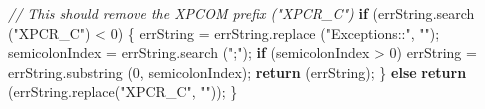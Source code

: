 \documentclass[]{article}
\newenvironment{Shaded}{}{}
\newcommand{\KeywordTok}[1]{\textcolor[rgb]{0.00,0.44,0.13}{\textbf{{#1}}}}
\newcommand{\DecValTok}[1]{\textcolor[rgb]{0.25,0.63,0.44}{{#1}}}
\newcommand{\StringTok}[1]{\textcolor[rgb]{0.25,0.44,0.63}{{#1}}}
\newcommand{\CommentTok}[1]{\textcolor[rgb]{0.38,0.63,0.69}{\textit{{#1}}}}
\newcommand{\OtherTok}[1]{\textcolor[rgb]{0.00,0.44,0.13}{{#1}}}
\newcommand{\FunctionTok}[1]{\textcolor[rgb]{0.02,0.16,0.49}{{#1}}}
\newcommand{\NormalTok}[1]{{#1}}
\begin{document}
\begin{Shaded}
\begin{Highlighting}[]
  \CommentTok{// This should remove the XPCOM prefix ("XPCR_C")}
  \KeywordTok{if} \NormalTok{(}\OtherTok{errString}\NormalTok{.}\FunctionTok{search} \NormalTok{(}\StringTok{"XPCR_C"}\NormalTok{) < }\DecValTok{0}\NormalTok{)}
  \NormalTok{\{}
    \NormalTok{errString = }\OtherTok{errString}\NormalTok{.}\FunctionTok{replace} \NormalTok{(}\StringTok{"Exceptions::"}\NormalTok{, }\StringTok{""}\NormalTok{);}
    \NormalTok{semicolonIndex = }\OtherTok{errString}\NormalTok{.}\FunctionTok{search} \NormalTok{(}\StringTok{";"}\NormalTok{);}
    \KeywordTok{if} \NormalTok{(semicolonIndex > }\DecValTok{0}\NormalTok{)}
        \NormalTok{errString = }\OtherTok{errString}\NormalTok{.}\FunctionTok{substring} \NormalTok{(}\DecValTok{0}\NormalTok{, semicolonIndex);}
    \KeywordTok{return} \NormalTok{(errString);}
  \NormalTok{\}}
  \KeywordTok{else}
      \KeywordTok{return} \NormalTok{(}\OtherTok{errString}\NormalTok{.}\FunctionTok{replace}\NormalTok{(}\StringTok{"XPCR_C"}\NormalTok{, }\StringTok{""}\NormalTok{));}
\NormalTok{\}}

      
\end{Highlighting}
\end{Shaded}
\end{document}
